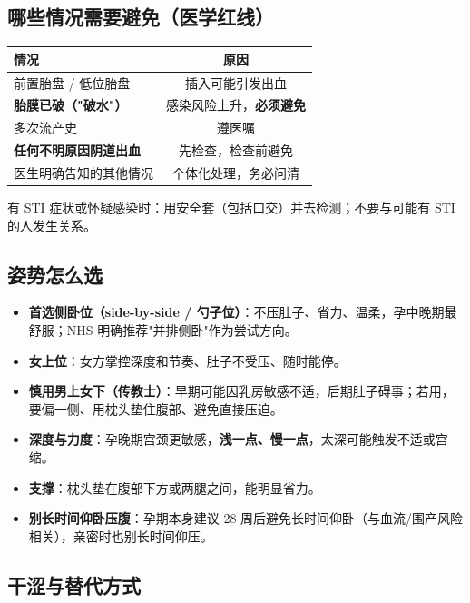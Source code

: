 \documentclass[12pt,UTF8,openany]{ctexbook}
\begin{document}
\subsection{哪些情况需要避免（医学红线）}

\begin{tabularx}{\linewidth}{X C}
\toprule
\textbf{情况} & \textbf{原因} \\
\midrule
前置胎盘 / 低位胎盘 & 插入可能引发出血 \\
\textbf{胎膜已破（"破水"）} & 感染风险上升，\textbf{必须避免} \\
多次流产史 & 遵医嘱 \\
\textbf{任何不明原因阴道出血} & 先检查，检查前避免 \\
医生明确告知的其他情况 & 个体化处理，务必问清 \\
\bottomrule
\end{tabularx}

\vspace{0.5em}
\noindent 有 STI 症状或怀疑感染时：用安全套（包括口交）并去检测；不要与可能有 STI 的人发生关系。

\subsection{姿势怎么选}

\begin{itemize}[leftmargin=2em,itemsep=0.3em]
  \item \textbf{首选侧卧位（side-by-side / 勺子位）}：不压肚子、省力、温柔，孕中晚期最舒服；NHS 明确推荐"并排侧卧"作为尝试方向。
  \item \textbf{女上位}：女方掌控深度和节奏、肚子不受压、随时能停。
  \item \textbf{慎用男上女下（传教士）}：早期可能因乳房敏感不适，后期肚子碍事；若用，要偏一侧、用枕头垫住腹部、避免直接压迫。
  \item \textbf{深度与力度}：孕晚期宫颈更敏感，\textbf{浅一点、慢一点}，太深可能触发不适或宫缩。
  \item \textbf{支撑}：枕头垫在腹部下方或两腿之间，能明显省力。
  \item \textbf{别长时间仰卧压腹}：孕期本身建议 28 周后避免长时间仰卧（与血流/围产风险相关），亲密时也别长时间仰压。
\end{itemize}

\subsection{干涩与替代方式}
\end{document}
